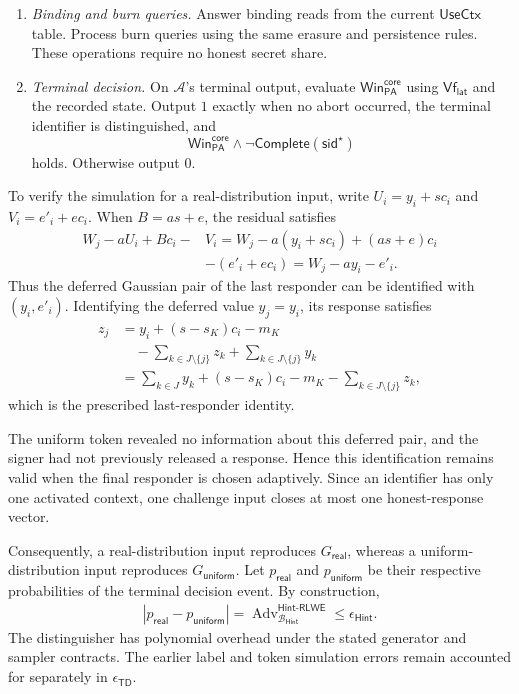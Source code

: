 \documentclass[lettersize,journal]{IEEEtran}
\begin{document}
\begin{enumerate}
		\item \emph{Binding and burn queries.}
		Answer binding reads from the current $\mathsf{UseCtx}$ table.
		Process burn queries using the same erasure and persistence rules.
		These operations require no honest secret share.
		
		\item \emph{Terminal decision.}
		On $\mathcal A$'s terminal output, evaluate
		$\mathsf{Win}_{\mathsf{PA}}^{\mathsf{core}}$
		using $\mathsf{Vf}_{\mathsf{lat}}$ and the recorded state.
		Output $1$ exactly when no abort occurred,
		the terminal identifier is distinguished, and
		\[
		\mathsf{Win}_{\mathsf{PA}}^{\mathsf{core}}
		\wedge
		\neg\mathsf{Complete}(\mathsf{sid}^{\star})
		\]
		holds.
		Otherwise output $0$.
	\end{enumerate}
	
	To verify the simulation for a real-distribution input,
	write $U_i=y_i+sc_i$ and $V_i=e'_i+ec_i$.
	When $B=as+e$, the residual satisfies
	\[
	\begin{aligned}
		W_j-aU_i+Bc_i-&V_i
		=W_j-a(y_i+sc_i)+(as+e)c_i\\
		&-(e'_i+ec_i) =W_j-ay_i-e'_i.
	\end{aligned}
	\]
	Thus the deferred Gaussian pair of the last responder
	can be identified with $(y_i,e'_i)$.
	Identifying the deferred value $y_j=y_i$, its response satisfies
	\[
	\begin{aligned}
	z_j
	&=y_i+(s-s_K)c_i-m_K\\
	&\quad-\sum_{k\in J\setminus\{j\}}z_k
	+\sum_{k\in J\setminus\{j\}}y_k\\
	&=\sum_{k\in J}y_k+(s-s_K)c_i-m_K
	-\sum_{k\in J\setminus\{j\}}z_k,
	\end{aligned}
	\]
	which is the prescribed last-responder identity.
	
	The uniform token revealed no information about this deferred pair,
	and the signer had not previously released a response.
	Hence this identification remains valid when the final responder
	is chosen adaptively.
	Since an identifier has only one activated context,
	one challenge input closes at most one honest-response vector.
	
	Consequently, a real-distribution input reproduces
	$G_{\mathsf{real}}$, whereas a uniform-distribution input
	reproduces $G_{\mathsf{uniform}}$.
	Let $p_{\mathsf{real}}$ and $p_{\mathsf{uniform}}$
	be their respective probabilities of the terminal decision event.
	By construction,
	\[
	\begin{aligned}
		|p_{\mathsf{real}}-p_{\mathsf{uniform}}|
		=
		\operatorname{Adv}^{\mathsf{Hint\text{-}RLWE}}
		_{\mathcal B_{\mathsf{Hint}}} \leq \epsilon_{\mathsf{Hint}}.
	\end{aligned}
	\]
	The distinguisher has polynomial overhead under the stated
	generator and sampler contracts.
	The earlier label and token simulation errors remain
	accounted for separately in $\epsilon_{\mathsf{TD}}$.
	
\end{document}
